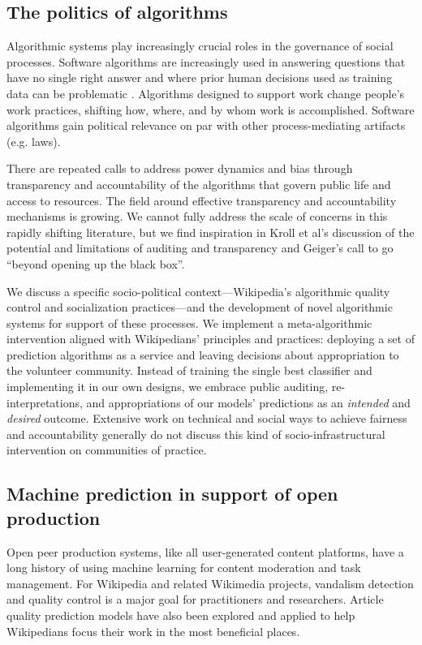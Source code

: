 \subsection{The politics of algorithms}
Algorithmic systems play increasingly crucial roles in the governance of social processes\cite{gillespie2014relevance}. Software algorithms are increasingly used in answering questions that have no single right answer and where prior human decisions used as training data can be problematic \cite{barocas2013governing}. Algorithms designed to support work change people's work practices, shifting how, where, and by whom work is accomplished\cite{crawford2016algorithm, zuboff1988age}. Software algorithms gain political relevance on par with other process-mediating artifacts (e.g. laws\cite{lessig1999code}).

There are repeated calls to address power dynamics and bias through transparency and accountability of the algorithms that govern public life and access to resources\cite{diakopoulos2017algorithmic,sandvig2014auditing}. The field around effective transparency and accountability mechanisms is growing. We cannot fully address the scale of concerns in this rapidly shifting literature, but we find inspiration in Kroll et al's discussion of the potential and limitations of auditing and transparency \cite{kroll2016accountable} and Geiger's call to go ``beyond opening up the black box\cite{geiger2017beyond}''.

We discuss a specific socio-political context---Wikipedia's algorithmic quality control and socialization practices---and the development of novel algorithmic systems for support of these processes.  We implement a meta-algorithmic intervention aligned with Wikipedians' principles and practices: deploying a set of prediction algorithms as a service and leaving decisions about appropriation to the volunteer community.  Instead of training the single best classifier and implementing it in our own designs, we embrace public auditing, re-interpretations, and appropriations of our models' predictions as an \emph{intended} and \emph{desired} outcome.  Extensive work on technical and social ways to achieve fairness and accountability generally do not discuss this kind of socio-infrastructural intervention on communities of practice.

\subsection{Machine prediction in support of open production}
Open peer production systems, like all user-generated content platforms, have a long history of using machine learning for content moderation and task management. For Wikipedia and related Wikimedia projects, vandalism detection and quality control is a major goal for practitioners and researchers.  Article quality prediction models have also been explored and applied to help Wikipedians focus their work in the most beneficial places.

